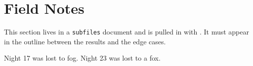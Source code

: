 \documentclass[../main.tex]{subfiles}
\begin{document}
\section{Field Notes}
\label{sec:fieldnotes}
This section lives in a \texttt{subfiles} document and is pulled in with \verb||. It must appear in the outline between the results and the edge cases.

Night 17 was lost to fog. Night 23 was lost to a fox.
\end{document}
